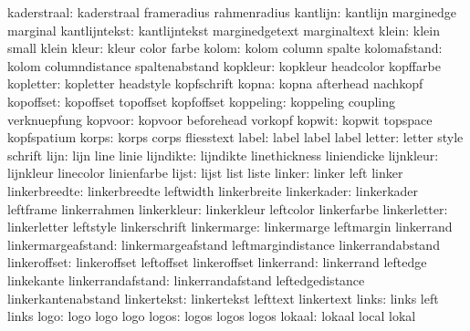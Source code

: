         kaderstraal:  kaderstraal          frameradius         rahmenradius
           kantlijn:  kantlijn             marginedge          marginal
      kantlijntekst:  kantlijntekst        marginedgetext      marginaltext
              klein:  klein                small               klein
              kleur:  kleur                color               farbe
              kolom:  kolom                column              spalte
       kolomafstand:  kolom                columndistance      spaltenabstand
           kopkleur:  kopkleur             headcolor           kopffarbe
          kopletter:  kopletter            headstyle           kopfschrift
              kopna:  kopna                afterhead           nachkopf
          kopoffset:  kopoffset            topoffset           kopfoffset 
          koppeling:  koppeling            coupling            verknuepfung
            kopvoor:  kopvoor              beforehead          vorkopf
             kopwit:  kopwit               topspace            kopfspatium
              korps:  korps                corps               fliesstext
              label:  label                label               label
             letter:  letter               style               schrift
               lijn:  lijn                 line                linie
          lijndikte:  lijndikte            linethickness       liniendicke
          lijnkleur:  lijnkleur            linecolor           linienfarbe
              lijst:  lijst                list                liste
             linker:  linker               left                linker
      linkerbreedte:  linkerbreedte        leftwidth           linkerbreite
        linkerkader:  linkerkader          leftframe           linkerrahmen
        linkerkleur:  linkerkleur          leftcolor           linkerfarbe
       linkerletter:  linkerletter         leftstyle           linkerschrift
        linkermarge:  linkermarge          leftmargin          linkerrand
 linkermargeafstand:  linkermargeafstand   leftmargindistance  linkerrandabstand
       linkeroffset:  linkeroffset         leftoffset          linkeroffset
         linkerrand:  linkerrand           leftedge            linkekante
  linkerrandafstand:  linkerrandafstand    leftedgedistance    linkerkantenabstand
        linkertekst:  linkertekst          lefttext            linkertext
              links:  links                left                links
               logo:  logo                 logo                logo
              logos:  logos                logos               logos
             lokaal:  lokaal               local               lokal
